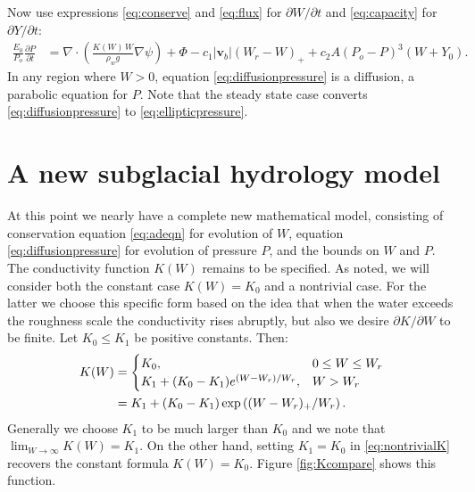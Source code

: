 \documentclass[11pt,final]{amsart}%
\newcommand\bv{\mathbf{v}}
\newcommand{\Div}{\nabla\cdot}
\newcommand{\grad}{\nabla}
\begin{document}
Now use expressions \eqref{eq:conserve} and \eqref{eq:flux} for $\partial W/\partial t$ and \eqref{eq:capacity} for $\partial Y/\partial t$:
\begin{align}
\frac{E_0}{P_o} \frac{\partial P}{\partial t} &= \Div \left(\frac{K(W)\,W}{\rho_w g} \grad \psi\right) + \Phi - c_1 |\bv_b| (W_r - W)_+  + c_2 A (P_o - P)^3 (W+Y_0). \label{eq:diffusionpressure}
\end{align}
In any region where $W>0$, equation \eqref{eq:diffusionpressure} is a diffusion, a parabolic equation for $P$.  Note that the steady state case converts \eqref{eq:diffusionpressure} to \eqref{eq:ellipticpressure}.


\section{A new subglacial hydrology model}

At this point we nearly have a complete new mathematical model, consisting of conservation equation \eqref{eq:adeqn} for evolution of $W$, equation \eqref{eq:diffusionpressure} for evolution of pressure $P$, and the bounds on $W$ and $P$.  The conductivity function $K(W)$ remains to be specified.  As noted, we will consider both the constant case $K(W)=K_0$ and a nontrivial case.  For the latter we choose this specific form based on the idea that when the water exceeds the roughness scale the conductivity rises abruptly, but also we desire $\partial K/\partial W$ to be finite.  Let $K_0 \le K_1$ be positive constants.  Then:
\begin{align}
K(W) &= \begin{cases} K_0, & 0 \le W \le W_r \\ K_1 + (K_0-K_1) e^{(W-W_r)/W_r}, & W > W_r \end{cases} \label{eq:nontrivialK} \\
  &= K_1 + (K_0-K_1) \exp\left((W-W_r)_+/W_r\right). \notag
\end{align}
Generally we choose $K_1$ to be much larger than $K_0$ and we note that $\lim_{W\to\infty}K(W)=K_1$.  On the other hand, setting $K_1=K_0$ in \eqref{eq:nontrivialK} recovers the constant formula $K(W)=K_0$.  Figure \ref{fig:Kcompare} shows this function.
\end{document}
